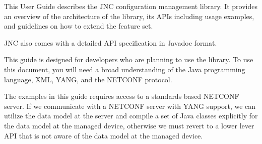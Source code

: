 \documentclass[a4paper,12pt]{memoir}
\begin{document}
This User Guide describes the JNC configuration management library. It provides
an overview of the architecture of the library, its APIs including usage
examples, and guidelines on how to extend the feature set.

JNC also comes with a detailed API specification in Javadoc format.

This guide is designed for developers who are planning to use the library. To
use this document, you will need a broad understanding of the Java programming
language, XML, YANG, and the NETCONF protocol.

The examples in this guide requires access to a standards based NETCONF server.
If we communicate with a NETCONF server with YANG support, we can utilize the
data model at the server and compile a set of Java classes explicitly for the
data model at the managed device, otherwise we must revert to a lower lever API
that is not aware of the data model at the managed device.
\end{document}
